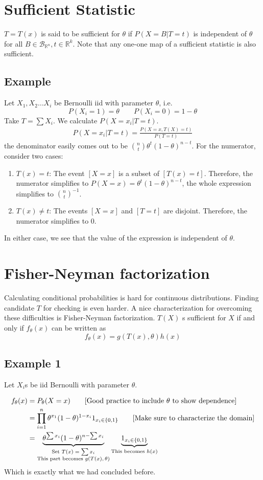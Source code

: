 \documentclass[oneside]{book}
\begin{document}
\section{Sufficient Statistic}
$T=T(x)$ is said to be sufficient for $\theta$ if $P(X=B|T=t)$ is independent of $\theta$ for all $B\in\mathcal B_{\mathbb R^n},t\in\mathbb R^k$.
Note that any one-one map of a sufficient statistic is also sufficient.
\subsection{Example}
Let $X_1,X_2\hdots X_i$ be Bernoulli iid with parameter $\theta$, i.e.
$$P(X_i=1)=\theta\qquad P(X_i=0)=1-\theta$$
Take $T=\sum X_i$. We calculate $P(X=x_i|T=t)$. 
\begin{align*}
    P(X=x_i|T=t)=\frac{P(X=x,T(X)=t)}{P(T=t)}
\end{align*}
the denominator easily comes out to be ${n\choose t}\theta^t(1-\theta)^{n-t}$. For the numerator, consider two cases:
\begin{enumerate}
    \item $T(x)=t$: The event $[X=x]$ is a subset of $[T(x)=t]$. Therefore, the numerator simplifies to $P(X=x)=\theta^t(1-\theta)^{n-t}$, the whole expression simplifies to ${n\choose t}^{-1}$.
    \item $T(x)\ne t$: The events $[X=x]$ and $[T=t]$ are disjoint. Therefore, the numerator simplifies to 0.
\end{enumerate}
In either case, we see that the value of the expression is independent of $\theta$.

\section{Fisher-Neyman factorization}
Calculating conditional probabilities is hard for continuous distributions. Finding candidate $T$ for checking is even harder. A nice characterization for overcoming these difficulties is Fisher-Neyman factorization. $T(X)$ s sufficient for $X$ if and only if $f_\theta(x)$ can be written as 
$$f_\theta(x)=g(T(x),\theta)h(x)$$
\subsection{Example 1}
Let $X_i$s be iid Bernoulli with parameter $\theta$.

\begin{align*}
    f_\theta(x)&=P_\theta(X=x)\tag*{\text{[Good practice to include $\theta$ to show dependence]}}\\
    &=\prod_{i=1}^n\theta^{x_1}(1-\theta)^{1-x_i}1_{x_i\in\{0,1\}}\tag*{\text{[Make sure to characterize the domain]}}\\
    &=\underbrace{\theta^{\sum x_i}(1-\theta)^{n-\sum x_i}}_{\substack{\text{Set $T(x)=\sum x_i$} \\ \text{This part becomes $g(T(x),\theta)$}}}\underbrace{1_{x_i\in\{0,1\}}}_{\text{This becomes $h(x)$}}
\end{align*}
Which is exactly what we had concluded before. 
\end{document}
